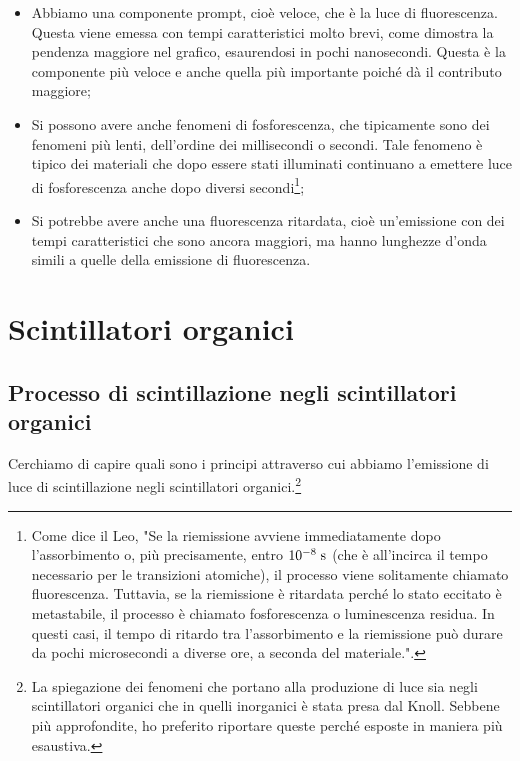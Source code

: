 \begin{itemize}[leftmargin=0.5cm]
   \item Abbiamo una componente prompt, cioè veloce, che è la luce di fluorescenza. Questa viene emessa con tempi caratteristici molto brevi, come dimostra la pendenza maggiore nel grafico, esaurendosi in pochi nanosecondi. Questa è la componente più veloce e anche quella più importante poiché dà il contributo maggiore;
   \item Si possono avere anche fenomeni di fosforescenza, che tipicamente sono dei fenomeni più lenti, dell'ordine dei millisecondi o secondi. Tale fenomeno è tipico dei materiali che dopo essere stati illuminati continuano a emettere luce di fosforescenza anche dopo diversi secondi\footnote{Come dice il Leo, "Se la riemissione avviene immediatamente dopo l'assorbimento o, più precisamente, entro $10^{-8} \; \rm s$ (che è all'incirca il tempo necessario per le transizioni atomiche), il processo viene solitamente chiamato fluorescenza. Tuttavia, se la riemissione è ritardata perché lo stato eccitato è metastabile, il processo è chiamato fosforescenza o luminescenza residua. In questi casi, il tempo di ritardo tra l'assorbimento e la riemissione può durare da pochi microsecondi a diverse ore, a seconda del materiale.".};
   \item Si potrebbe avere anche una fluorescenza ritardata, cioè un'emissione con dei tempi caratteristici che sono ancora maggiori, ma hanno lunghezze d'onda simili a quelle della emissione di fluorescenza.
\end{itemize}


\section{Scintillatori organici}

\subsection{Processo di scintillazione negli scintillatori organici}

Cerchiamo di capire quali sono i principi attraverso cui abbiamo l'emissione di luce di scintillazione negli scintillatori organici.\footnote{La spiegazione dei fenomeni che portano alla produzione di luce sia negli scintillatori organici che in quelli inorganici è stata presa dal Knoll. Sebbene più approfondite, ho preferito riportare queste perché esposte in maniera più esaustiva.}

